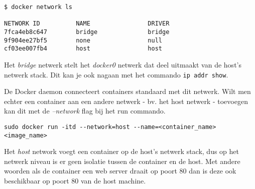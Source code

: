 \begin{verbatim}
$ docker network ls

NETWORK ID          NAME                DRIVER
7fca4eb8c647        bridge              bridge
9f904ee27bf5        none                null
cf03ee007fb4        host                host
\end{verbatim}

Het \textit{bridge} netwerk stelt het \textit{docker0} netwerk dat deel uitmaakt van de host's netwerk stack. Dit kan je ook nagaan met het commando \texttt{ip addr show}.

De Docker daemon connecteert containers standaard met dit netwerk. Wilt men echter een container aan een andere netwerk - bv. het host netwerk - toevoegen kan dit met de \textit{--network} flag bij het run commando.

\begin{verbatim}
sudo docker run -itd --network=host --name=<container_name> <image_name>
\end{verbatim}

Het \textit{host} network voegt een container op de host's netwerk stack, dus op het netwerk niveau is er geen isolatie tussen de container en de host. Met andere woorden als de container een web server draait op poort 80 dan is deze ook beschikbaar op poort 80 van de host machine.